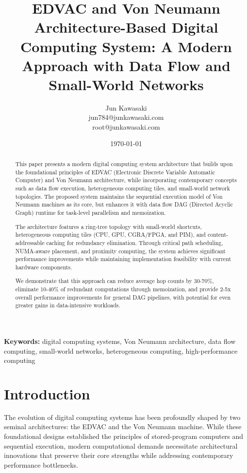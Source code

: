 \documentclass[11pt,a4paper]{article}
\title{EDVAC and Von Neumann Architecture-Based Digital Computing System: A Modern Approach with Data Flow and Small-World Networks}
\author{Jun Kawasaki\\
jun784@junkawasaki.com\\
root@junkawasaki.com}
\date{\today}
\begin{document}
\maketitle

\begin{abstract}
This paper presents a modern digital computing system architecture that builds upon the foundational principles of EDVAC (Electronic Discrete Variable Automatic Computer) and Von Neumann architecture, while incorporating contemporary concepts such as data flow execution, heterogeneous computing tiles, and small-world network topologies. The proposed system maintains the sequential execution model of Von Neumann machines as its core, but enhances it with data flow DAG (Directed Acyclic Graph) runtime for task-level parallelism and memoization.

The architecture features a ring-tree topology with small-world shortcuts, heterogeneous computing tiles (CPU, GPU, CGRA/FPGA, and PIM), and content-addressable caching for redundancy elimination. Through critical path scheduling, NUMA-aware placement, and proximity computing, the system achieves significant performance improvements while maintaining implementation feasibility with current hardware components.

We demonstrate that this approach can reduce average hop counts by 30-70\%, eliminate 10-40\% of redundant computations through memoization, and provide 2-5x overall performance improvements for general DAG pipelines, with potential for even greater gains in data-intensive workloads.
\end{abstract}

\textbf{Keywords:} digital computing systems, Von Neumann architecture, data flow computing, small-world networks, heterogeneous computing, high-performance computing

\section{Introduction}

The evolution of digital computing systems has been profoundly shaped by two seminal architectures: the EDVAC and the Von Neumann machine. While these foundational designs established the principles of stored-program computers and sequential execution, modern computational demands necessitate architectural innovations that preserve their core strengths while addressing contemporary performance bottlenecks.
\end{document}

